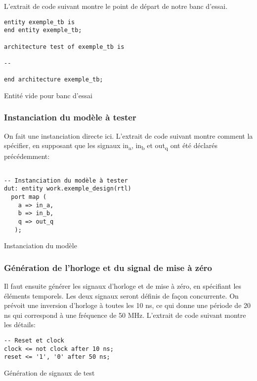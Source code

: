 \documentclass[11pt]{article}
\begin{document}
L'extrait de code suivant montre le point de départ de notre banc
d'essai.

\begin{listing}[htbp]
\begin{verbatim}
entity exemple_tb is
end entity exemple_tb;

architecture test of exemple_tb is

--

end architecture exemple_tb;
\end{verbatim}
\caption{Entité vide pour banc d'essai}
\end{listing}

\subsubsection{Instanciation du modèle à tester}
\label{sec:orgd8a8040}

On fait une instanciation directe ici. L'extrait de code suivant
montre comment la spécifier, en supposant que les signaux in\textsubscript{a}, in\textsubscript{b}
et out\textsubscript{q} ont été déclarés précédemment:

\begin{listing}[htbp]
\begin{verbatim}

-- Instanciation du modèle à tester 
dut: entity work.exemple_design(rtl)
  port map (
    a => in_a,
    b => in_b,
    q => out_q
   );

\end{verbatim}
\caption{Instanciation du modèle}
\end{listing}

\subsubsection{Génération de l'horloge et du signal de mise à zéro}
\label{sec:orgda5ade0}

Il faut ensuite générer les signaux d'horloge et de mise à zéro, en
spécifiant les éléments temporels. Les deux signaux seront définis de
façon concurrente. On prévoit une inversion d'horloge à toutes les 10
ns, ce qui donne une période de 20 ns qui correspond à une fréquence
de 50 MHz. L'extrait de code suivant montre les détails:

\begin{listing}[htbp]
\begin{verbatim}
-- Reset et clock
clock <= not clock after 10 ns;
reset <= '1', '0' after 50 ns;
\end{verbatim}
\caption{Génération de signaux de test}
\end{listing}
\end{document}
